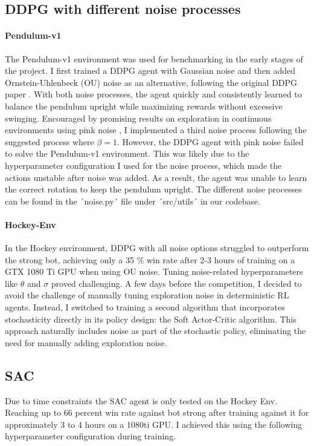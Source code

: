 \subsection{DDPG with different noise processes}
\paragraph{Pendulum-v1}
The Pendulum-v1 environment was used for benchmarking in the early stages of the project. I first trained a DDPG agent with Gaussian noise and then added Ornstein-Uhlenbeck (OU) noise as an alternative, following the original DDPG paper \cite{ddpg_original}. With both noise processes, the agent quickly and consistently learned to balance the pendulum upright while maximizing rewards without excessive swinging.
Encouraged by promising results on exploration in continuous environments using pink noise \cite{eberhard2023pink}, I implemented a third noise process following the suggested process where \(\beta = 1\). However, the DDPG agent with pink noise failed to solve the Pendulum-v1 environment. This was likely due to the hyperparameter configuration I used for the noise process, which made the actions unstable after noise was added. As a result, the agent was unable to learn the correct rotation to keep the pendulum upright. The different noise processes can be found in the ´noise.py´ file under ´src/utils´ in our codebase.

\paragraph{Hockey-Env} 
In the Hockey environment, DDPG with all noise options struggled to outperform the strong bot, achieving only a 35 \% win rate after 2-3 hours of training on a GTX 1080 Ti GPU when using OU noise. Tuning noise-related hyperparameters like $\theta$ and $\sigma$ proved challenging. A few days before the competition, I decided to avoid the challenge of manually tuning exploration noise in deterministic RL agents. Instead, I switched to training a second algorithm that incorporates stochasticity directly in its policy design: the Soft Actor-Critic algorithm. This approach naturally includes noise as part of the stochastic policy, eliminating the need for manually adding exploration noise.

\subsection{SAC}
Due to time constraints the SAC agent is only tested on the Hockey Env. Reaching up to 66 percent win rate against bot strong after training against it for approximately 3 to 4 hours on a 1080ti GPU. I achieved this using the following hyperparameter configuration during training.

